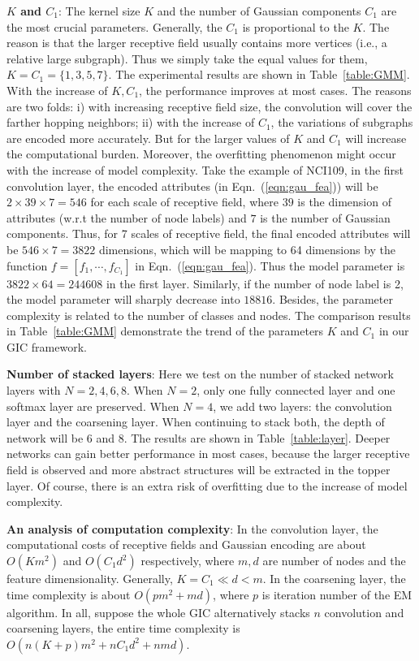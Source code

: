 \documentclass[letterpaper]{article} \usepackage{aaai19}  \usepackage{times}  \usepackage{helvet}  \usepackage{courier}  \usepackage{url}  \usepackage{graphicx}  \frenchspacing  \setlength{\pdfpagewidth}{8.5in}  \setlength{\pdfpageheight}{11in}
\def\ie{{i.e.}} \def\etal{{et.al}}
\begin{document}
\textbf{$K$ and $C_1$}: The kernel size $K$ and the number of Gaussian components $C_1$ are the most crucial parameters. Generally, the $C_1$ is proportional to the $K$. The reason is that the larger receptive field usually contains more vertices (\ie, a relative large subgraph). Thus we simply take the equal values for them, $K=C_1 = \{1,3,5,7\}$. The experimental results are shown in Table~\ref{table:GMM}. With the increase of $K, C_1$, the performance improves at most cases. The reasons are two folds: i) with increasing receptive field size, the convolution will cover the farther hopping neighbors; ii) with the increase of $C_1$, the variations of subgraphs are encoded more accurately. But for the larger values of $K$ and $C_1$ will increase the computational burden. Moreover, the overfitting phenomenon might occur with the increase of model complexity. Take the example of NCI109, in the first convolution layer, the encoded attributes (in Eqn.~(\ref{eqn:gau_fea})) will be $2\times39\times7=546$ for each scale of receptive field, where $39$ is the dimension of attributes (w.r.t the number of node labels) and $7$ is the number of Gaussian components. Thus, for 7 scales of receptive field, the final encoded attributes will be $546\times7=3822$ dimensions, which will be mapping to 64 dimensions by the function $f=[f_1,\cdots,f_{C_1}]$ in Eqn.~(\ref{eqn:gau_fea}). Thus the model parameter is $3822\times64=244608$ in the first layer. Similarly, if the number of node label is 2, the model parameter will sharply decrease into $18816$. Besides, the parameter complexity is related to the number of classes and nodes. The comparison results in Table~\ref{table:GMM} demonstrate the trend of the parameters $K$ and $C_1$ in our GIC framework.

\textbf{Number of stacked layers}: Here we test on the number of stacked network layers with $N=2,4,6,8$. When $N=2$, only one fully connected layer and one softmax layer are preserved. When $N=4$, we add two layers: the convolution layer and the coarsening layer. When continuing to stack both, the depth of network will be 6 and 8. The results are shown in Table~\ref{table:layer}. Deeper networks can gain better performance in most cases, because the larger receptive field is observed and more abstract structures will be extracted in the topper layer. Of course, there is an extra risk of overfitting due to the increase of model complexity.

\textbf{An analysis of computation complexity}: In the convolution layer, the computational costs of receptive fields and Gaussian encoding are about $O(Km^2)$ and $O(C_1d^2)$ respectively, where $m, d$ are number of nodes and the feature dimensionality. Generally, $K=C_1\ll d<m$. In the coarsening layer, the time complexity is about $O(pm^2+md)$, where $p$ is iteration number of the EM algorithm. In all, suppose the whole GIC alternatively stacks $n$ convolution and coarsening layers, the entire time complexity is $O(n(K+p)m^2+nC_1d^2+nmd)$.
\end{document}
